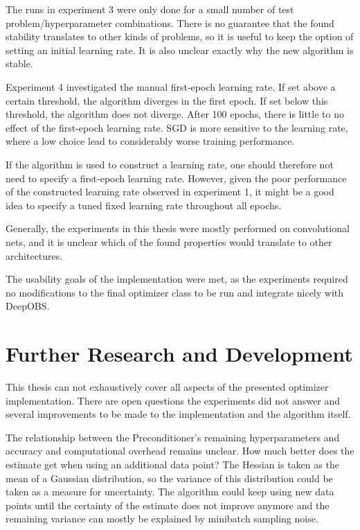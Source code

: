 \documentclass[twoside,12pt,a4paper]{report}
\begin{document}
The runs in experiment 3 were only done for a small number of test problem/hyperparameter combinations. There is no guarantee that the found stability translates to other kinds of problems, so it is useful to keep the option of setting an initial learning rate. It is also unclear exactly why the new algorithm is stable.

Experiment 4 investigated the manual first-epoch learning rate. If set above a certain threshold, the algorithm diverges in the first epoch. If set below this threshold, the algorithm does not diverge. After 100 epochs, there is little to no effect of the first-epoch learning rate. SGD is more sensitive to the learning rate, where a low choice lead to considerably worse training performance.

If the algorithm is used to construct a learning rate, one should therefore not need to specify a first-epoch learning rate. However, given the poor performance of the constructed learning rate observed in experiment 1, it might be a good idea to specify a tuned fixed learning rate throughout all epochs.

Generally, the experiments in this thesis were mostly performed on convolutional nets, and it is unclear which of the found properties would translate to other architectures.

The usability goals of the implementation were met, as the experiments required no modifications to the final optimizer class to be run and integrate nicely with DeepOBS.

\section{Further Research and Development}
This thesis can not exhaustively cover all aspects of the presented optimizer implementation. There are open questions the experiments did not answer and several improvements to be made to the implementation and the algorithm itself.

The relationship between the Preconditioner's remaining hyperparameters and accuracy and computational overhead remains unclear. How much better does the estimate get when using an additional data point? The Hessian is taken as the mean of a Gaussian distribution, so the variance of this distribution could be taken as a measure for uncertainty. The algorithm could keep using new data points until the certainty of the estimate does not improve anymore and the remaining variance can mostly be explained by minibatch sampling noise.
\end{document}
